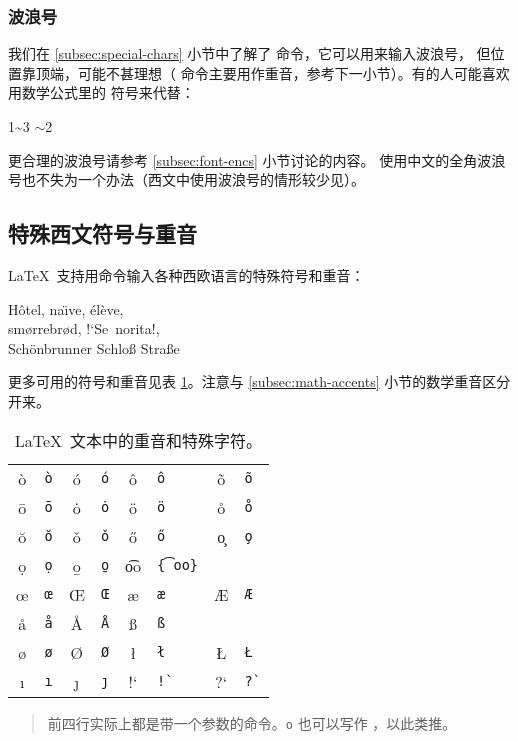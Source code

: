 \subsubsection{波浪号}

我们在 \ref{subsec:special-chars} 小节中了解了 \cmd{\textasciitilde} 命令，它可以用来输入波浪号，
但位置靠顶端，可能不甚理想（\cmd{\textasciitilde} 命令主要用作重音，参考下一小节）。有的人可能喜欢用数学公式里的  符号来代替：
\begin{example}
1\~{}3 $\sim$2
\end{example}

更合理的波浪号请参考 \ref{subsec:font-encs} 小节讨论的内容。
使用中文的全角波浪号也不失为一个办法（西文中使用波浪号的情形较少见）。

\subsection{特殊西文符号与重音}\label{subsec:accents}

\LaTeX\ 支持用命令输入各种西欧语言的特殊符号和重音：
\begin{example}
H\^otel, na\"\i ve, \'el\`eve,\\
sm\o rrebr\o d, !`Se\ norita!,\\
Sch\"onbrunner Schlo\ss{}
Stra\ss e
\end{example}

更多可用的符号和重音见表 \ref{tbl:accents}。注意与 \ref{subsec:math-accents} 小节的数学重音区分开来。

\def\TSYM #1{#1       & \texttt{\string#1}}
\def\TACC #1#2{#1{#2} & \texttt{\string#1#2}}       %
\def\TTACC #1#2{#1{#2} & \texttt{\string#1 #2}}     %
\def\WTACC #1#2{#1{#2} & \texttt{\string#1\{#2\}}}  %
\begin{table}[htp]
\centering
\caption{\LaTeX\ 文本中的重音和特殊字符。} \label{tbl:accents}
\begin{tabular}{*4{cl}}
 \hline
 \TACC{\`}{o} & \TACC{\'}{o} & \TACC{\^}{o} & \TACC{\~}{o} \\
 \TACC{\=}{o} & \TACC{\.}{o} & \TACC{\"}{o} & \TTACC{\r}{o}\\
 \TTACC{\u}{o} & \TTACC{\v}{o} & \TTACC{\H}{o} & \TTACC{\c}{o} \\
 \TTACC{\d}{o} & \TTACC{\b}{o} & \WTACC{\t}{oo} \\[6pt]
 \TSYM{\oe} & \TSYM{\OE} & \TSYM{\ae} & \TSYM{\AE} \\
 \TSYM{\aa} & \TSYM{\AA} & \TSYM{\ss} \\[6pt]
 \TSYM{\o}  & \TSYM{\O}  & \TSYM{\l} & \TSYM{\L} \\
 \TSYM{\i}  & \TSYM{\j}  & !` & \verb|!`| & ?` & \verb|?`| \\
 \hline
\end{tabular}
\begin{quote}\footnotesize%
前四行实际上都是带一个参数的命令。\cmd{\textasciicircum}\texttt{o} 也可以写作
\cmd{\textasciicircum}，以此类推。
\end{quote}
\end{table}

